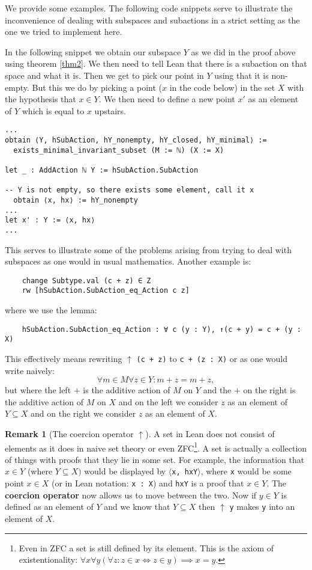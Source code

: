\documentclass[11pt]{article}
\theoremstyle{definition}              %
\theoremstyle{definition}              %
\theoremstyle{definition}              %
\newtheorem{remark}{Remark}[section]
\begin{document}
We provide some examples. The following code snippets serve to illustrate the inconvenience of dealing with subspaces and subactions in a strict setting as the one we tried to implement here. 

In the following snippet we obtain our subspace $Y$ as we did in the proof above using theorem \ref{thm2}. We then need to tell Lean that there is a subaction on that space and what it is. Then we get to pick our point in $Y$ using that it is non-empty. But this we do by picking a point ($x$ in the code below) in the set $X$ with the hypothesis that $x \in Y$. We then need to define a new point $x'$ as an element of $Y$ which is equal to $x$ upstairs.

\begin{lstlisting}
...
obtain ⟨Y, hSubAction, hY_nonempty, hY_closed, hY_minimal⟩ :=
  exists_minimal_invariant_subset (M := ℕ) (X := X)

let _ : AddAction ℕ Y := hSubAction.SubAction

-- Y is not empty, so there exists some element, call it x
  obtain ⟨x, hx⟩ := hY_nonempty
...
let x' : Y := ⟨x, hx⟩
...
\end{lstlisting}

This serves to illustrate some of the problems arising from trying to deal with subspaces as one would in usual mathematics. Another example is:

\begin{lstlisting}
    change Subtype.val (c + z) ∈ Z
    rw [hSubAction.SubAction_eq_Action c z]
\end{lstlisting}
where we use the lemma:
\begin{lstlisting}
    hSubAction.SubAction_eq_Action : ∀ c (y : Y), ↑(c + y) = c + (y : X)
\end{lstlisting}
This effectively means rewriting $\uparrow$ \verb|(c + z)| to \verb|c + (z : X)| or as one would write naively:
\begin{equation}
    \forall m \in M \forall z \in Y: m+z = m+z,
\end{equation}
but where the left $+$ is the additive action of $M$ on $Y$ and the $+$ on the right is the additive action of $M$ on $X$ and on the left we consider $z$ as an element of $Y \subseteq X$ and on the right we consider $z$ as an element of $X$.

\begin{remark} [The coercion operator $\uparrow$]
A set in Lean does not consist of elements as it does in naive set theory or even ZFC\footnote{Even in ZFC a set is still defined by its element. This is the axiom of existentionality: $\forall x \forall y (\forall z: z \in x \iff z \in y) \implies x=y$.}. A set is actually a collection of things with proofs that they lie in some set. For example, the information that $x \in Y$ (where $Y \subseteq X)$ would be displayed by $\langle$\verb|x, hxY|$\rangle$, where \verb|x| would be some point $x \in X$ (or in Lean notation: \verb|x : X|) and \verb|hxY| is a proof that $x \in Y$. The \textbf{coercion operator} now allows us to move between the two. Now if $y \in Y$ is defined as an element of $Y$ and we know that $Y \subseteq X$ then $\uparrow$ \verb|y| makes \verb|y| into an element of $X$.
\end{remark}
\end{document}
